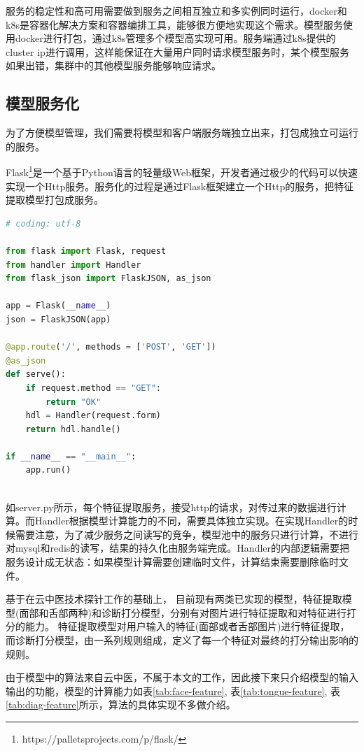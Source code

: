 服务的稳定性和高可用需要做到服务之间相互独立和多实例同时运行，docker和k8s是容器化解决方案和容器编排工具，能够很方便地实现这个需求。模型服务使用docker进行打包，通过k8s管理多个模型高实现可用。服务端通过k8s提供的cluster ip进行调用，这样能保证在大量用户同时请求模型服务时，某个模型服务如果出错，集群中的其他模型服务能够响应请求。


\subsection{模型服务化}
为了方便模型管理，我们需要将模型和客户端服务端独立出来，打包成独立可运行的服务。

Flask\footnote{https://palletsprojects.com/p/flask/}是一个基于Python语言的轻量级Web框架，开发者通过极少的代码可以快速实现一个Http服务。服务化的过程是通过Flask框架建立一个Http的服务，把特征提取模型打包成服务。

\begin{lstlisting}[language={Python}, title=server.py]
# coding: utf-8

from flask import Flask, request
from handler import Handler
from flask_json import FlaskJSON, as_json

app = Flask(__name__)
json = FlaskJSON(app)

@app.route('/', methods = ['POST', 'GET'])
@as_json
def serve():
    if request.method == "GET":
        return "OK"
    hdl = Handler(request.form)
    return hdl.handle()

if __name__ == "__main__":
    app.run()
    
\end{lstlisting}

如server.py所示，每个特征提取服务，接受http的请求，对传过来的数据进行计算。而Handler根据模型计算能力的不同，需要具体独立实现。在实现Handler的时候需要注意，为了减少服务之间读写的竞争，模型池中的服务只进行计算，不进行对mysql和redis的读写，结果的持久化由服务端完成。Handler的内部逻辑需要把服务设计成无状态：如果模型计算需要创建临时文件，计算结束需要删除临时文件。

基于在云中医技术探针工作的基础上， 目前现有两类已实现的模型，特征提取模型(面部和舌部两种)和诊断打分模型，分别有对图片进行特征提取和对特征进行打分的能力。
特征提取模型对用户输入的特征(面部或者舌部图片)进行特征提取，而诊断打分模型，由一系列规则组成，定义了每一个特征对最终的打分输出影响的规则。

由于模型中的算法来自云中医，不属于本文的工作，因此接下来只介绍模型的输入输出的功能，模型的计算能力如表\ref{tab:face-feature}, 表\ref{tab:tongue-feature}, 表\ref{tab:diag-feature}所示，算法的具体实现不多做介绍。




